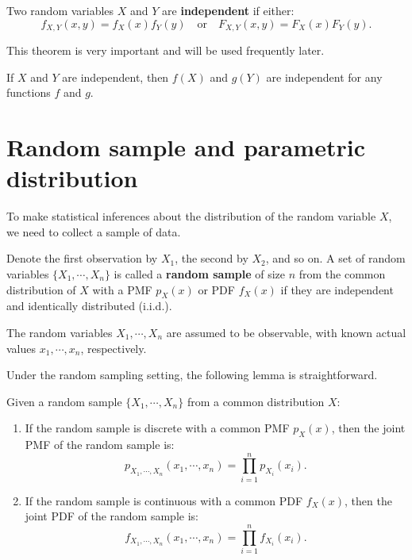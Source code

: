 \documentclass{huhtakm-template-book-v2}
\begin{document}
    \begin{defn}
        Two random variables $X$ and $Y$ are \textbf{independent} if either:
        \begin{equation*}
            f_{X,Y}(x, y) = f_{X}(x)f_{Y}(y) \quad \text{or} \quad F_{X,Y}(x, y) = F_{X}(x)F_{Y}(y).
        \end{equation*}
    \end{defn}
    This theorem is very important and will be used frequently later.
    \begin{thm}
        If $X$ and $Y$ are independent, then $f(X)$ and $g(Y)$ are independent for any functions $f$ and $g$.
    \end{thm}
    \newpage

\section{Random sample and parametric distribution}
    To make statistical inferences about the distribution of the random variable $X$, we need to collect a sample of data.
    \begin{defn}
        Denote the first observation by $X_{1}$, the second by $X_{2}$, and so on. A set of random variables $\{X_{1},\cdots,X_{n}\}$ is called a \textbf{random sample} of size $n$ from the common distribution of $X$ with a PMF $p_{X}(x)$ or PDF $f_{X}(x)$ if they are independent and identically distributed (i.i.d.).
    \end{defn}
    \begin{rem}
        The random variables $X_{1},\cdots,X_{n}$ are assumed to be observable, with known actual values $x_{1},\cdots,x_{n}$, respectively.
    \end{rem}
    Under the random sampling setting, the following lemma is straightforward.
    \begin{lem}
        Given a random sample $\{X_{1},\cdots,X_{n}\}$ from a common distribution $X$:
        \begin{enumerate}
            \item If the random sample is discrete with a common PMF $p_{X}(x)$, then the joint PMF of the random sample is:
            \begin{equation*}
                p_{X_{1},\cdots,X_{n}}(x_{1},\cdots,x_{n}) = \prod_{i=1}^{n} p_{X_{i}}(x_{i}).
            \end{equation*}
            \item If the random sample is continuous with a common PDF $f_{X}(x)$, then the joint PDF of the random sample is:
            \begin{equation*}
                f_{X_{1},\cdots,X_{n}}(x_{1},\cdots,x_{n}) = \prod_{i=1}^{n} f_{X_{i}}(x_{i}).
            \end{equation*}
        \end{enumerate}
    \end{lem}
\end{document}
